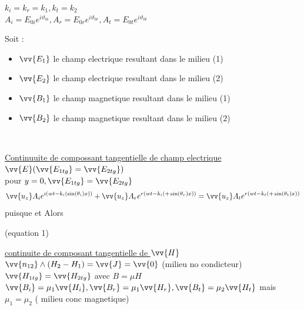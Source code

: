 \documentclass[12pt]{book}
\begin{document}
                \begin{center}
                    $k_i =k_r =k_1 , k_t =k_2$ \\
                    $A_i = E_{0i}e^{i\vartheta_{0i}} , A_r = E_{0r}e^{i\vartheta_{0r}} , A_t = E_{0t}e^{i\vartheta_{0t}}$
                \end{center}
                
                Soit :
                \begin{itemize}
                    \item $\vv{E_1}$ le champ electrique resultant dans le milieu (1)
                    \item $\vv{E_2}$ le champ electrique resultant dans le milieu (2)
                    \item $\vv{B_1}$ le champ magnetique resultant dans le milieu (1)
                    \item $\vv{B_2}$ le champ magnetique resultant dans le milieu (2)
                \end{itemize}
                \begin{center}
                     \\
                \end{center}
                \underline{Continuuite de compossant tangentielle de champ electrique $\vv{E} (\vv{E_{1tg}}=\vv{E_{2tg}})$}
                    \\ pour $y=0 , \vv{E_{1tg}}=\vv{E_{2tg}} $
                    \[\vv{u_z}A_ie^{i(wt-k_i(\sin(\theta_i)x))} + \vv{u_z}A_re^{r(wt-k_i(+\sin(\theta_r)x))}  =\vv{u_z}A_te^{r(wt-k_t(+\sin(\theta_t)x))} \]
                    puisque  et  Alors
                \begin{center}
                     (equation 1)
                \end{center}
                \underline{continuite de composant tangentielle de $\vv{H}$} \\
                    $\vv{n_{12}}\wedge(H_2 - H_1) = \vv{J} = \vv{0}$ (milieu no condicteur) \\
                    $\vv{H_{1tg}}=\vv{H_{2tg}}$ avec $B= \mu H$ \\
                    $\vv{B_i} = \mu_1 \vv{H_i} , \vv{B_r} = \mu_1 \vv{H_r} , \vv{B_t} = \mu_2 \vv{H_t}$
                    mais $\mu_1 =\mu_2$ ( milieu conc magnetique)\\
\end{document}

